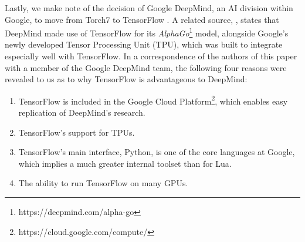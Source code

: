 Lastly, we make note of the decision of Google DeepMind, an AI division within
Google, to move from Torch7 to TensorFlow \cite{deepmind}. A related source,
\cite{tpu}, states that DeepMind made use of TensorFlow for its
\emph{AlphaGo}\footnote{https://deepmind.com/alpha-go} model, alongside Google's
newly developed Tensor Processing Unit (TPU), which was built to integrate
especially well with TensorFlow. In a correspondence of the authors of this
paper with a member of the Google DeepMind team, the following four reasons were
revealed to us as to why TensorFlow is advantageous to DeepMind:

\begin{enumerate}
\item TensorFlow is included in the Google Cloud
  Platform\footnote{https://cloud.google.com/compute/}, which enables easy
  replication of DeepMind's research.
\item TensorFlow's support for TPUs.
\item TensorFlow's main interface, Python, is one of the core languages at
  Google, which implies a much greater internal toolset than for Lua.
\item The ability to run TensorFlow on many GPUs.
\end{enumerate}


